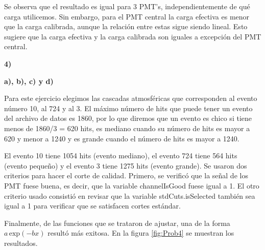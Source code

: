 \documentclass[11pt]{article}
\begin{document}
Se observa que el resultado es igual para 3 PMT's, independientemente de qué carga utilicemos. Sin embargo, para el PMT central la carga efectiva es menor que la carga calibrada, aunque la relación entre estas sigue siendo lineal. Esto sugiere que la carga efectiva y la carga calibrada son iguales a excepción del PMT central. 
\pagebreak

\textbf{4)}

\textbf{a), b), c) y d)}

Para este ejercicio elegimos las cascadas atmosféricas que corresponden al evento número 10, al 724 y al 3. El máximo número de hits que puede tener un evento del archivo de datos es 1860, por lo que diremos que un evento es chico si tiene menos de 1860/3 = 620 hits, es mediano cuando su número de hits es mayor a 620 y menor a 1240 y es grande cuando el número de hits es mayor a 1240.

\hspace{5mm}El evento 10 tiene 1054 hits (evento mediano), el evento 724 tiene 564 hits (evento pequeño) y el evento 3 tiene 1275 hits (evento grande). Se usaron dos criterios para hacer el corte de calidad. Primero, se verificó que la señal de los PMT fuese buena, es decir, que la variable channelIsGood fuese igual a 1. El otro criterio usado consistió en revisar que la variable stdCuts.isSelected también sea igual a 1 para verificar que se satisfacen cortes estándar.

\hspace{5mm}Finalmente, de las funciones que se trataron de ajustar, una de la forma $a\,\textrm{exp}(-bx)$ resultó más exitosa. En la figura \ref{fig:Prob4} se muestran los resultados.
\end{document}

